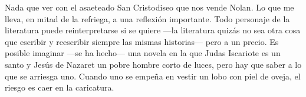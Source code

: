 Nada que ver con el asaeteado San Cristodiseo que nos vende Nolan. Lo que me lleva, en mitad de la refriega, a una reflexión importante. Todo personaje de la literatura puede reinterpretarse si se quiere ---la literatura quizás no sea otra cosa que escribir y reescribir siempre las mismas historias--- pero a un precio. Es posible imaginar ---se ha hecho--- una novela en la que Judas Iscariote es un santo y Jesús de Nazaret un pobre hombre corto de luces, pero hay que saber a lo que se arriesga uno. Cuando uno se empeña en vestir un lobo con piel de oveja, el riesgo es caer en la caricatura.

%
%
